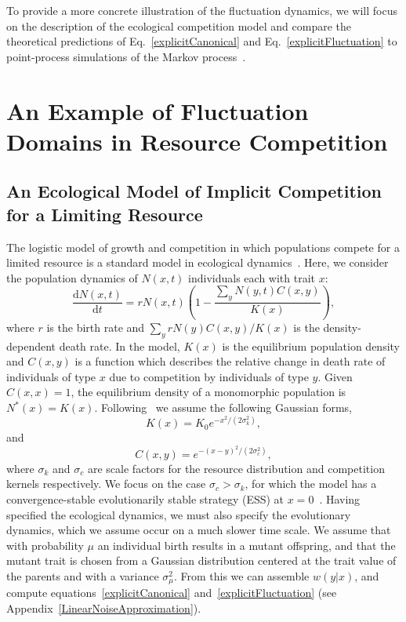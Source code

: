 To provide a more concrete illustration of the fluctuation dynamics, we will focus on the description of the ecological competition model and compare the theoretical predictions of Eq.~\eqref{explicitCanonical} and Eq.~\eqref{explicitFluctuation} to point-process simulations of the Markov process~\citep{Gillespie}.   
 
 
\section{An Example of Fluctuation Domains in Resource Competition}
\label{compete}
\subsection{An Ecological Model of Implicit Competition for a Limiting Resource}
The logistic model of growth and competition in which populations
compete for a limited resource is a standard model in ecological dynamics~\citep{dieckmann_nat1999}.  Here, we consider
the population dynamics of $N(x,t)$ individuals each with trait $x$:
\begin{equation}
\frac{\mathrm{d} N(x,t)}{\mathrm{d} t} = rN(x,t)\left(1-\frac{\sum_yN(y,t)C(x,y)}{K(x)}\right),\label{general_logistic}
\end{equation}
where $r$ is the birth rate and $\sum_yrN(y)C(x,y)/K(x)$ is the density-dependent death rate.  
In the model, $K(x)$ is the equilibrium population density and $C(x,y)$ is a function which describes the relative change in death rate of individuals of type $x$ due to competition by individuals of type $y$.  Given $C(x,x)=1$, the equilibrium density of a monomorphic population is $N^{\ast}(x)=K(x)$.  Following~\citet{dieckmann_nat1999} we assume the following Gaussian forms,
\begin{equation}
K(x)=K_0e^{-x^2/(2\sigma_k^2)}, \label{K}
\end{equation}
and
\begin{equation}
C(x,y)=e^{-(x-y)^2/(2\sigma_c^2)}, \label{C}
\end{equation}
where $\sigma_k$ and $\sigma_c$ are scale factors for the resource distribution and competition kernels respectively.  We focus on the case $\sigma_c>\sigma_k$, for which the model has a convergence-stable evolutionarily stable strategy (ESS) at $x=0$~\citep{geritz_evoeco1998}.  Having specified the ecological dynamics, we must also specify the evolutionary dynamics, which we assume occur on a much slower time scale. We assume that with probability $\mu$ an individual birth results in a mutant offspring, and that the mutant trait is chosen from a Gaussian distribution centered at the trait value of the parents and with a variance $\sigma_{\mu}^2$.  From this we can assemble $w(y|x)$, and compute equations~\eqref{explicitCanonical} and~\eqref{explicitFluctuation} (see Appendix~\ref{LinearNoiseApproximation}).  
 
